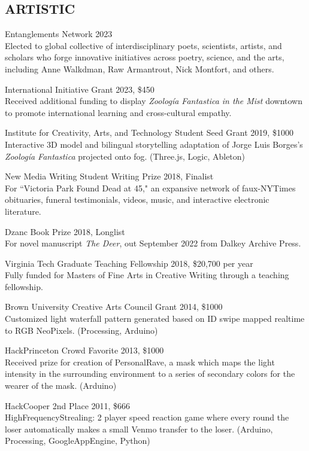  \subsection{ARTISTIC}
Entanglements Network 2023 \\
 Elected to global collective of interdisciplinary poets, scientists, artists, and scholars who forge innovative initiatives across poetry, science, and the arts, including Anne Walkdman, Raw Armantrout, Nick Montfort, and others. 
 
 International Initiative Grant 2023, \$450  \\
Received additional funding to display \emph{Zoolog\'ia Fantastica in the Mist} downtown to promote international learning and cross-cultural empathy. 
 
 Institute for Creativity, Arts, and Technology Student Seed Grant 2019, \$1000  \\
Interactive 3D model and bilingual storytelling adaptation of Jorge Luis Borges's \emph{Zoolog\'ia Fantastica} projected onto fog. (Three.js, Logic, Ableton)

New Media Writing Student Writing Prize 2018, Finalist\\
For ``Victoria Park Found Dead at 45," an expansive network of faux-NYTimes obituaries, funeral testimonials, videos, music, and interactive electronic literature. 

Dzanc Book Prize 2018, Longlist \\
For novel manuscript \emph{The Deer}, out September 2022 from Dalkey Archive Press.

Virginia Tech Graduate Teaching Fellowship 2018, \$20,700 per year \\
Fully funded for Masters of Fine Arts in Creative Writing through a teaching fellowship.

Brown University Creative Arts Council Grant 2014, \$1000 \\
Customized light waterfall pattern generated based on ID swipe mapped realtime to RGB NeoPixels. (Processing, Arduino)

HackPrinceton Crowd Favorite 2013, \$1000 \\
Received prize for creation of PersonalRave, a mask which maps the light intensity in the surrounding environment to a series of secondary colors for the wearer of the mask. (Arduino)

HackCooper 2nd Place 2011, \$666  \\
HighFrequencyStrealing: 2 player speed reaction game where every round the loser automatically makes a small Venmo transfer to the loser. (Arduino, Processing, GoogleAppEngine, Python)

